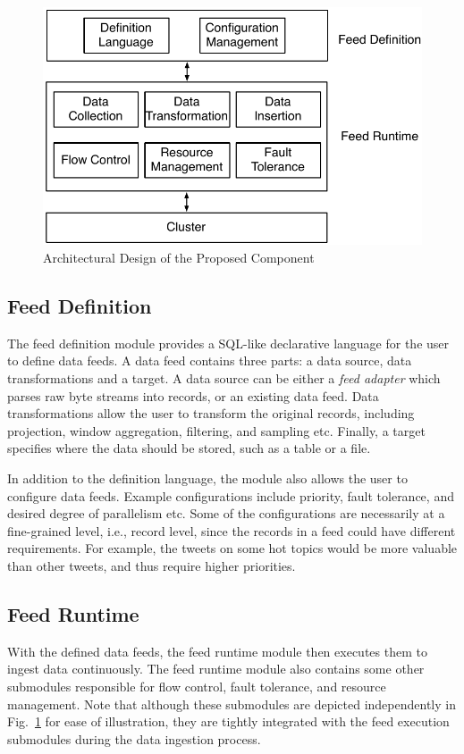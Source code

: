 \documentclass[conference]{llncs}
\newcommand{\reffigure}[1]{Fig.~\ref{#1}}
\begin{document}
\begin{figure}[t]
\centering
\includegraphics[width=0.45\linewidth]{architecture.pdf}
\caption{Architectural Design of the Proposed Component}
\label{fig:architecture}
\end{figure}

\subsection{Feed Definition}
The feed definition module provides a SQL-like declarative language for the user to define data feeds.
A data feed contains three parts: a data source, data transformations and a target.
A data source can be either a \emph{feed adapter} which parses raw byte streams into records, or an existing data feed.
Data transformations allow the user to transform the original records, including projection, window aggregation, filtering, and sampling etc.
Finally, a target specifies where the data should be stored, such as a table or a file.

In addition to the definition language, the module also allows the user to configure data feeds.
Example configurations include priority, fault tolerance, and desired degree of parallelism etc.
Some of the configurations are necessarily at a fine-grained level, i.e., record level, since the records in a feed could have different requirements.
For example, the tweets on some hot topics would be more valuable than other tweets, and thus require higher priorities.

\subsection{Feed Runtime}
With the defined data feeds, the feed runtime module then executes them to ingest data continuously.
The feed runtime module also contains some other submodules responsible for flow control, fault tolerance, and resource management.
Note that although these submodules are depicted independently in \reffigure{fig:architecture} for ease of illustration, they are tightly integrated with the feed execution submodules during the data ingestion process.
\end{document}
